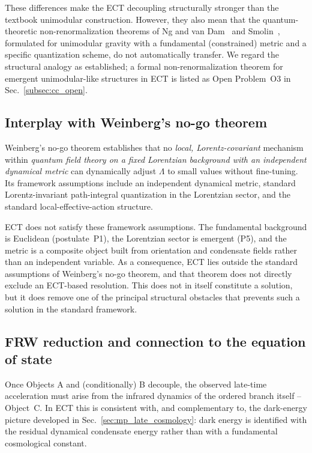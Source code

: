 These differences make the ECT decoupling structurally stronger than
the textbook unimodular construction. However, they also mean that the
quantum-theoretic non-renormalization theorems of Ng and van
Dam~\cite{NgVanDam1990} and Smolin~\cite{Smolin2009}, formulated for
unimodular gravity with a fundamental (constrained) metric and a
specific quantization scheme, do not automatically transfer. We
regard the structural analogy as established; a formal
non-renormalization theorem for emergent unimodular-like structures in
ECT is listed as Open Problem~O3 in Sec.~\ref{subsec:cc_open}.

\subsection{Interplay with Weinberg's no-go theorem}
\label{subsec:weinberg_cc}

Weinberg's no-go theorem \cite{Weinberg1989} establishes that no
\emph{local, Lorentz-covariant} mechanism within \emph{quantum field
theory on a fixed Lorentzian background with an independent dynamical
metric} can dynamically adjust $\Lambda$ to small values without
fine-tuning. Its framework assumptions include an independent
dynamical metric, standard Lorentz-invariant path-integral quantization
in the Lorentzian sector, and the standard local-effective-action
structure.

ECT does not satisfy these framework assumptions. The fundamental
background is Euclidean (postulate~P1), the Lorentzian sector is
emergent (P5), and the metric is a composite object built from
orientation and condensate fields rather than an independent variable.
As a consequence, ECT lies outside the standard assumptions of
Weinberg's no-go theorem, and that theorem does not directly exclude
an ECT-based resolution. This does not in itself constitute a
solution, but it does remove one of the principal structural obstacles
that prevents such a solution in the standard framework.

\subsection{FRW reduction and connection to the equation of state}
\label{subsec:frw_cc}

Once Objects A and (conditionally) B decouple, the observed late-time
acceleration must arise from the infrared dynamics of the ordered
branch itself -- Object~C. In ECT this is consistent with, and
complementary to, the dark-energy picture developed in
Sec.~\ref{sec:mp_late_cosmology}: dark energy is identified with the
residual dynamical condensate energy rather than with a fundamental
cosmological constant.

